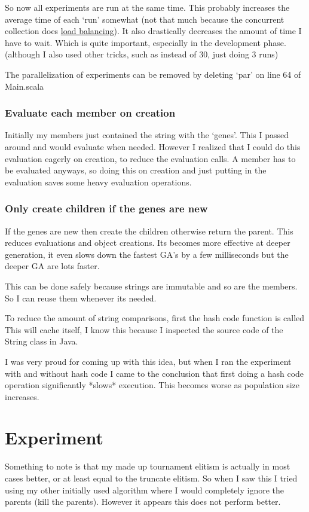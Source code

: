 \documentclass{article}
\begin{document}
\begin{empfile}
So now all experiments are run at the same time. This probably increases the
average time of each `run' somewhat (not that much because the concurrent
collection does \href{http://docs.scala-lang.org/overviews/parallel-collections/configuration.html}{load balancing}).
It also drastically decreases the amount of time I have to wait. Which is quite
important, especially in the development phase. (although I also used
other tricks, such as instead of 30, just doing 3 runs)

The parallelization of experiments can be removed by deleting `par' on line 64
of Main.scala

\subsubsection{Evaluate each member on creation}
Initially my members just contained the string with the `genes'. This I passed
around and would evaluate when needed. However I realized that I could do this
evaluation eagerly on creation, to reduce the evaluation calls. A member has
to be evaluated anyways, so doing this on creation and just putting in the
evaluation saves some heavy evaluation operations.

\subsubsection{Only create children if the genes are new}
If the genes are new then create the children otherwise return the parent.
This reduces evaluations and object creations. Its becomes more effective
at deeper generation, it even slows down the fastest GA's by a few milliseconds
but the deeper GA are lots faster.

This can be done safely because strings are immutable and so are the members.
So I can reuse them whenever its needed.

To reduce the amount of string comparisons, first the hash code function is called
This will cache itself, I know this because I inspected the source code of the
String class in Java.

I was very proud for coming up with  this idea, but when I ran the experiment with
and without hash code I came to the conclusion that first doing a hash code operation
significantly *slows* execution. This becomes worse as population size increases.

\section{Experiment}
Something to note is that my made up tournament elitism is actually in most
cases better, or at least equal to the truncate elitism. So when I saw
this I tried using my other initially used algorithm where I would completely
ignore the parents (kill the parents). However it appears this does not
perform better.


\end{empfile}
\end{document}
